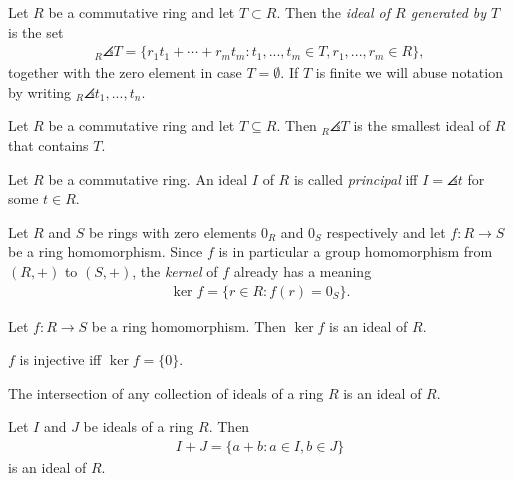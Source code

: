 \documentclass{article}
\begin{document}
\begin{definition}
	Let $R$ be a commutative ring and let $T\subset R$. Then the \emph{ideal of $R$
		generated by $T$} is the set
	\begin{align*}
		_R\angles{T} = \{r_1t_1+\cdots+r_mt_m : t_1,...,t_m\in T,r_1,...,r_m\in R\},
	\end{align*}
	together with the zero element in case $T=\emptyset$. If $T$ is finite we will
	abuse notation by writing $_R\angles{t_1,...,t_n}$.
\end{definition}

\begin{proposition}[Proposition 3.4.14]
	Let $R$ be a commutative ring and let $T\subseteq R$. Then $_R\angles{T}$ is the
	smallest ideal of $R$ that contains $T$.
\end{proposition}

\begin{definition}
	Let $R$ be a commutative ring. An ideal $I$ of $R$ is called \emph{principal} iff
	$I=\angles{t}$ for some $t\in R$.
\end{definition}

\begin{definition}
	Let $R$ and $S$ be rings with zero elements $0_R$ and $0_S$ respectively and
	let $f:R\to S$ be a ring homomorphism. Since $f$ is in particular a group homomorphism
	from $(R,+)$ to $(S,+)$, the \emph{kernel} of $f$ already has a meaning
	\begin{align*}
		\ker f = \{r\in R : f(r) = 0_S\}.
	\end{align*}
\end{definition}

\begin{proposition}[Proposition 3.4.18]
	Let $f:R\to S$ be a ring homomorphism. Then $\ker f$ is an ideal of $R$.
\end{proposition}

\begin{lemma}[Lemma 3.4.20]
	$f$ is injective iff $\ker f = \{0\}$.
\end{lemma}

\begin{lemma}[Lemma 3.4.21]
	The intersection of any collection of ideals of a ring $R$ is an ideal of $R$.
\end{lemma}

\begin{lemma}[Lemma 3.4.22]
	Let $I$ and $J$ be ideals of a ring $R$. Then
	\begin{align*}
		I+J=\{a+b:a\in I, b\in J\}
	\end{align*}
	is an ideal of $R$.
\end{lemma}
\end{document}
